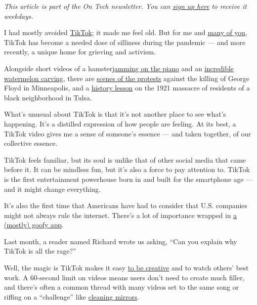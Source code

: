 \emph{This article is part of the On Tech newsletter. You can}
\href{https://www.nytimes.com/newsletters/signup/OT}{\emph{sign up
here}} \emph{to receive it weekdays.}

I had mostly avoided
\href{https://www.nytimes.com/2020/07/26/technology/tiktok-china-ban-model.html}{TikTok};
it made me feel old. But for me and
\href{https://www.cnn.com/2020/05/05/tech/tiktok-bytedance-coronavirus-intl-hnk/index.html}{many
of you}, TikTok has become a needed dose of silliness during the
pandemic --- and more recently, a unique home for grieving and activism.

Alongside short videos of a
hamster\href{https://www.tiktok.com/@hamstarz/video/6829822490131434757}{jamming
on the piano} and an
\href{https://www.tiktok.com/@cakelover363/video/6824418668445846789?lang=en}{incredible
watermelon carving}, there are
\href{https://www.tiktok.com/@kareemrahma/video/6831762210218446085?lang=US}{scenes
of the protests} against the killing of George Floyd in Minneapolis, and
a
\href{https://www.tiktok.com/@theleftistdude/video/6826796142299254021}{history
lesson} on the 1921 massacre of residents of a black neighborhood in
Tulsa.

What's unusual about TikTok is that it's not another place to see what's
happening. It's a distilled expression of how people are feeling. At its
best, a TikTok video gives me a sense of someone's essence --- and taken
together, of our collective essence.

TikTok feels familiar, but its soul is unlike that of other social media
that came before it. It can be mindless fun, but it's also a force to
pay attention to. TikTok is the first entertainment powerhouse born in
and built for the smartphone age --- and it might change everything.

It's also the first time that Americans have had to consider that U.S.
companies might not always rule the internet. There's a lot of
importance wrapped in
\href{https://www.nytimes.com/2019/03/10/style/what-is-tik-tok.html}{a
(mostly) goofy app}.

Last month, a reader named Richard wrote us asking, ``Can you explain
why TikTok is all the rage?''

Well, the magic is TikTok makes it easy
\href{https://www.nytimes.com/interactive/2019/10/10/arts/TIK-TOK.html}{to
be creative} and to watch others' best work. A 60-second limit on videos
means users don't need to create much filler, and there's often a common
thread with many videos set to the same song or riffing on a
``challenge'' like
\href{https://www.vulture.com/2020/06/tiktok-wipe-it-down-challenge-bmw-kenny-explainer.html}{cleaning
mirrors}.

